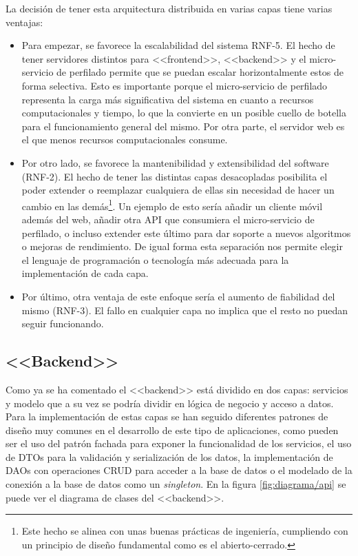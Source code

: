La decisión de tener esta arquitectura distribuida en varias capas tiene varias ventajas:
\begin{itemize}
    \item Para empezar, se favorece la escalabilidad del sistema RNF-5. El hecho de tener servidores distintos para <<frontend>>, <<backend>> y el micro-servicio de perfilado permite que se puedan escalar horizontalmente estos de forma selectiva. Esto es importante porque el micro-servicio de perfilado representa la carga más significativa del sistema en cuanto a recursos computacionales y tiempo, lo que la convierte en un posible cuello de botella para el funcionamiento general del mismo. Por otra parte, el servidor web es el que menos recursos computacionales consume.
    \item Por otro lado, se favorece la mantenibilidad y extensibilidad del software (RNF-2). El hecho de tener las distintas capas desacopladas posibilita el poder extender o reemplazar cualquiera de ellas sin necesidad de hacer un cambio en las demás\footnote{Este hecho se alinea con unas buenas prácticas de ingeniería, cumpliendo con un principio de diseño fundamental como es el abierto-cerrado.}. Un ejemplo de esto sería añadir un cliente móvil además del web, añadir otra API que consumiera el micro-servicio de perfilado, o incluso extender este último para dar soporte a nuevos algoritmos o mejoras de rendimiento. De igual forma esta separación nos permite elegir el lenguaje de programación o tecnología más adecuada para la implementación de cada capa.
    \item Por último, otra ventaja de este enfoque sería el aumento de fiabilidad del mismo (RNF-3). El fallo en cualquier capa no implica que el resto no puedan seguir funcionando.
\end{itemize}
\subsection{<<Backend>>}
Como ya se ha comentado el <<backend>> está dividido en dos capas: servicios y modelo que a su vez se podría dividir en lógica de negocio y acceso a datos. Para la implementación de estas capas se han seguido diferentes patrones de diseño muy comunes en el desarrollo de este tipo de aplicaciones, como pueden ser el uso del patrón fachada para exponer la funcionalidad de los servicios, el uso de DTOs para la validación y serialización de los datos, la implementación de DAOs con operaciones CRUD para acceder a la base de datos o el modelado de la conexión a la base de datos como un \textit{singleton}. En la figura \ref{fig:diagrama/api} se puede ver el diagrama de clases del <<backend>>.

